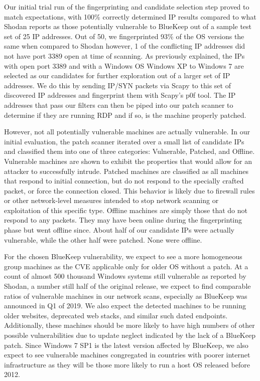 Our initial trial run of the fingerprinting and candidate selection step proved to match expectations, with 100\% correctly determined IP results compared to what Shodan reports as those potentially vulnerable to BlueKeep out of a sample test set of 25 IP addresses. Out of 50, we fingerprinted 93\% of the OS versions the same when compared to Shodan however, 1 of the conflicting IP addresses did not have port 3389 open at time of scanning. As previously explained, the IPs with open port 3389 and with a Windows OS Windows XP to Windows 7 are selected as our candidates for further exploration out of a larger set of IP addresses. We do this by sending IP/SYN packets via Scapy to this set of discovered IP addresses and fingerprint them with Scapy's p0f tool. The IP addresses that pass our filters can then be piped into our patch scanner to determine if they are running RDP and if so, is the machine properly patched.

However, not all potentially vulnerable machines are actually vulnerable. In our initial evaluation, the patch scanner iterated over a small list of candidate IPs and classified them into one of three categories: Vulnerable, Patched, and Offline. Vulnerable machines are shown to exhibit the properties that would allow for an attacker to successfully intrude. Patched machines are classified as all machines that respond to initial connection, but do not respond to the specially crafted packet, or force the connection closed. This behavior is likely due to firewall rules or other network-level measures intended to stop network scanning or exploitation of this specific type. Offline machines are simply those that do not respond to any packets. They may have been online during the fingerprinting phase but went offline since. About half of our candidate IPs were actually vulnerable, while the other half were patched. None were offline.

For the chosen BlueKeep vulnerability, we expect to see a more homogeneous group machines as the CVE applicable only for older OS without a patch. At a count of almost 500 thousand Windows systems still vulnerable as reported by Shodan, a number still half of the original release, we expect to find comparable ratios of vulnerable machines in our network scans, especially as BlueKeep was announced in Q1 of 2019. We also expect the detected machines to be running older websites, deprecated web stacks, and similar such dated endpoints. Additionally, these machines should be more likely to have high numbers of other possible vulnerabilities due to update neglect indicated by the lack of a BlueKeep patch. Since Windows 7 SP1 is the latest version affected by BlueKeep, we also expect to see vulnerable machines congregated in countries with poorer internet infrastructure as they will be those more likely to run a host OS released before 2012.

